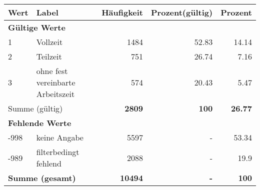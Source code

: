      \begin{longtable}{lXrrr}
     \toprule
     \textbf{Wert} & \textbf{Label} & \textbf{Häufigkeit} & \textbf{Prozent(gültig)} & \textbf{Prozent} \\
     \endhead
     \midrule
     \multicolumn{5}{l}{\textbf{Gültige Werte}}\\

     1 &
     \multicolumn{1}{X}{ Vollzeit   } &


       \num{1484} &
       \num[round-mode=places,round-precision=2]{52,83} &
         \num[round-mode=places,round-precision=2]{14,14} \\

     2 &
     \multicolumn{1}{X}{ Teilzeit   } &


       \num{751} &
       \num[round-mode=places,round-precision=2]{26,74} &
         \num[round-mode=places,round-precision=2]{7,16} \\

     3 &
     \multicolumn{1}{X}{ ohne fest vereinbarte Arbeitszeit   } &


       \num{574} &
       \num[round-mode=places,round-precision=2]{20,43} &
         \num[round-mode=places,round-precision=2]{5,47} \\
     \midrule
     \multicolumn{2}{l}{Summe (gültig)} &
       \textbf{\num{2809}} &
     \textbf{100} &
       \textbf{\num[round-mode=places,round-precision=2]{26,77}} \\
     \multicolumn{5}{l}{\textbf{Fehlende Werte}}\\
       -998 &
       keine Angabe &
         \num{5597} &
        - &
         \num[round-mode=places,round-precision=2]{53,34} \\
       -989 &
       filterbedingt fehlend &
         \num{2088} &
        - &
         \num[round-mode=places,round-precision=2]{19,9} \\
     \midrule
     \multicolumn{2}{l}{\textbf{Summe (gesamt)}} &
          \textbf{\num{10494}} &
        \textbf{-} &
        \textbf{100} \\
     \bottomrule
     \end{longtable}
     
